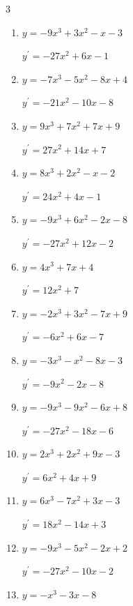 \begin{multicols}{3}
\begin{enumerate}
        $\displaystyle y^{\prime}=-3x^{2}+18x-1$

  \item $y=-9x^{3}+3x^{2}-x-3$

        $\displaystyle y^{\prime}=-27x^{2}+6x-1$

\columnbreak %

  \item $y=-7x^{3}-5x^{2}-8x+4$

        $\displaystyle y^{\prime}=-21x^{2}-10x-8$

  \item $y=9x^{3}+7x^{2}+7x+9$

        $\displaystyle y^{\prime}=27x^{2}+14x+7$

  \item $y=8x^{3}+2x^{2}-x-2$

        $\displaystyle y^{\prime}=24x^{2}+4x-1$

  \item $y=-9x^{3}+6x^{2}-2x-8$

        $\displaystyle y^{\prime}=-27x^{2}+12x-2$

  \item $y=4x^{3}+7x+4$

        $\displaystyle y^{\prime}=12x^{2}+7$

  \item $y=-2x^{3}+3x^{2}-7x+9$

        $\displaystyle y^{\prime}=-6x^{2}+6x-7$

  \item $y=-3x^{3}-x^{2}-8x-3$

        $\displaystyle y^{\prime}=-9x^{2}-2x-8$

  \item $y=-9x^{3}-9x^{2}-6x+8$

        $\displaystyle y^{\prime}=-27x^{2}-18x-6$

  \item $y=2x^{3}+2x^{2}+9x-3$

        $\displaystyle y^{\prime}=6x^{2}+4x+9$

  \item $y=6x^{3}-7x^{2}+3x-3$

        $\displaystyle y^{\prime}=18x^{2}-14x+3$

  \item $y=-9x^{3}-5x^{2}-2x+2$

        $\displaystyle y^{\prime}=-27x^{2}-10x-2$

  \item $y=-x^{3}-3x-8$


\end{enumerate}
\end{multicols}

